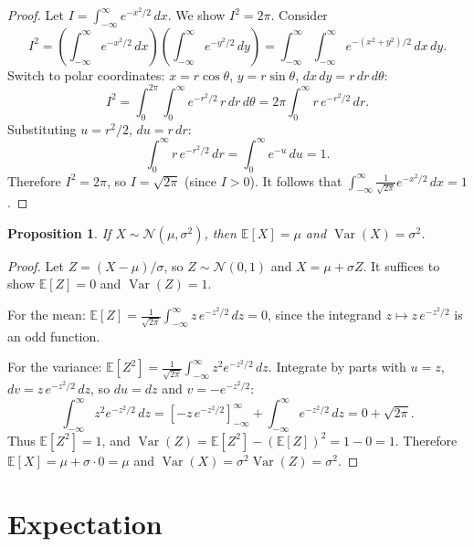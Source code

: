 \documentclass[11pt,a4paper]{article}
\theoremstyle{definition}
\theoremstyle{plain}
\newtheorem{proposition}[theorem]{Proposition}
\theoremstyle{remark}
\newcommand{\E}{\mathbb{E}}
\DeclareMathOperator{\Var}{Var}
\begin{document}
\begin{proof}
Let $I = \int_{-\infty}^\infty e^{-x^2/2}\,dx$. We show $I^2 = 2\pi$. Consider
\[
    I^2 = \left(\int_{-\infty}^\infty e^{-x^2/2}\,dx\right)
          \left(\int_{-\infty}^\infty e^{-y^2/2}\,dy\right)
        = \int_{-\infty}^\infty \int_{-\infty}^\infty e^{-(x^2+y^2)/2}\,dx\,dy.
\]
Switch to polar coordinates: $x = r\cos\theta$, $y = r\sin\theta$,
$dx\,dy = r\,dr\,d\theta$:
\[
    I^2 = \int_0^{2\pi}\int_0^\infty e^{-r^2/2}\,r\,dr\,d\theta
    = 2\pi \int_0^\infty r\,e^{-r^2/2}\,dr.
\]
Substituting $u = r^2/2$, $du = r\,dr$:
\[
    \int_0^\infty r\,e^{-r^2/2}\,dr = \int_0^\infty e^{-u}\,du = 1.
\]
Therefore $I^2 = 2\pi$, so $I = \sqrt{2\pi}$ (since $I > 0$). It follows that
$\int_{-\infty}^\infty \frac{1}{\sqrt{2\pi}}e^{-x^2/2}\,dx = 1$.
\end{proof}

\begin{proposition}
\label{prop:normal_moments}
If $X \sim \mathcal{N}(\mu, \sigma^2)$, then $\E[X] = \mu$ and $\Var(X) = \sigma^2$.
\end{proposition}

\begin{proof}
Let $Z = (X - \mu)/\sigma$, so $Z \sim \mathcal{N}(0,1)$ and $X = \mu + \sigma Z$.
It suffices to show $\E[Z] = 0$ and $\Var(Z) = 1$.

For the mean: $\E[Z] = \frac{1}{\sqrt{2\pi}}\int_{-\infty}^\infty z\,e^{-z^2/2}\,dz = 0$,
since the integrand $z \mapsto z\,e^{-z^2/2}$ is an odd function.

For the variance: $\E[Z^2] = \frac{1}{\sqrt{2\pi}}\int_{-\infty}^\infty z^2 e^{-z^2/2}\,dz$.
Integrate by parts with $u = z$, $dv = z\,e^{-z^2/2}\,dz$, so $du = dz$ and
$v = -e^{-z^2/2}$:
\[
    \int_{-\infty}^\infty z^2 e^{-z^2/2}\,dz
    = \left[-z\,e^{-z^2/2}\right]_{-\infty}^\infty + \int_{-\infty}^\infty e^{-z^2/2}\,dz
    = 0 + \sqrt{2\pi}.
\]
Thus $\E[Z^2] = 1$, and $\Var(Z) = \E[Z^2] - (\E[Z])^2 = 1 - 0 = 1$. Therefore
$\E[X] = \mu + \sigma \cdot 0 = \mu$ and $\Var(X) = \sigma^2 \Var(Z) = \sigma^2$.
\end{proof}

\section{Expectation}
\label{sec:expectation}
\end{document}
